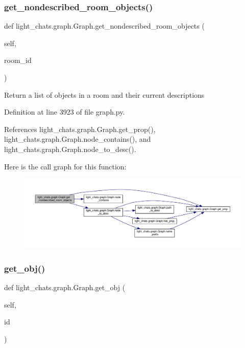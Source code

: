 \subsubsection{\texorpdfstring{get\+\_\+nondescribed\+\_\+room\+\_\+objects()}{get\_nondescribed\_room\_objects()}}
{\footnotesize\ttfamily def light\+\_\+chats.\+graph.\+Graph.\+get\+\_\+nondescribed\+\_\+room\+\_\+objects (\begin{DoxyParamCaption}\item[{}]{self,  }\item[{}]{room\+\_\+id }\end{DoxyParamCaption})}

\begin{DoxyVerb}Return a list of objects in a room and their current descriptions\end{DoxyVerb}
 

Definition at line 3923 of file graph.\+py.



References light\+\_\+chats.\+graph.\+Graph.\+get\+\_\+prop(), light\+\_\+chats.\+graph.\+Graph.\+node\+\_\+contains(), and light\+\_\+chats.\+graph.\+Graph.\+node\+\_\+to\+\_\+desc().

Here is the call graph for this function\+:
\nopagebreak
\begin{figure}[H]
\begin{center}
\leavevmode
\includegraphics[width=350pt]{classlight__chats_1_1graph_1_1Graph_a3830f1a541b3a892a6e37c314b5b5205_cgraph}
\end{center}
\end{figure}
\mbox{\label{classlight__chats_1_1graph_1_1Graph_ad965678de8b784a4c1506a8814f39767}} 
\subsubsection{\texorpdfstring{get\+\_\+obj()}{get\_obj()}}
{\footnotesize\ttfamily def light\+\_\+chats.\+graph.\+Graph.\+get\+\_\+obj (\begin{DoxyParamCaption}\item[{}]{self,  }\item[{}]{id }\end{DoxyParamCaption})}

